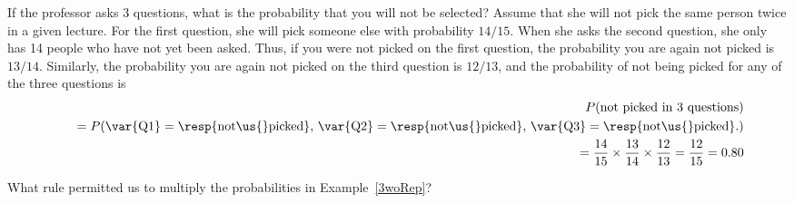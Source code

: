 \begin{examplewrap}
\begin{nexample}{If the professor asks 3 questions, what is the probability that you will not be selected? Assume that she will not pick the same person twice in a given lecture.}\label{3woRep}
For the first question, she will pick someone else with probability $14/15$. When she asks the second question, she only has 14 people who have not yet been asked. Thus, if you were not picked on the first question, the probability you are again not picked is $13/14$. Similarly, the probability you are again not picked on the third question is $12/13$, and the probability of not being picked for any of the three questions is
\begin{eqnarray*}
&&P(\text{not picked in 3 questions}) \\
&&\quad = P(\text{\var{Q1}} = \text{\resp{not\us{}picked}, }\text{\var{Q2}} = \text{\resp{not\us{}picked}, }\text{\var{Q3}} = \text{\resp{not\us{}picked}.}) \\
&&\quad = \frac{14}{15}\times\frac{13}{14}\times\frac{12}{13} = \frac{12}{15} = 0.80
\end{eqnarray*}
\end{nexample}
\end{examplewrap}

\begin{exercisewrap}
\begin{nexercise}
What rule permitted us to multiply the probabilities in Example~\ref{3woRep}?\footnotemark
\end{nexercise}
\end{exercisewrap}

